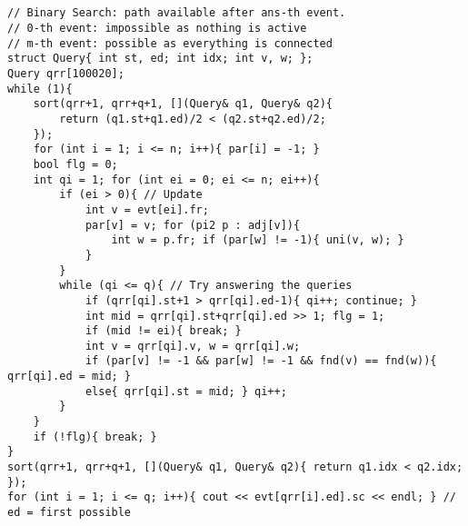 \documentclass[landscape, 8pt, a4paper, oneside, twocolumn]{extarticle}
\begin{document}
\subsection{}
\begin{verbatim}
// Binary Search: path available after ans-th event.
// 0-th event: impossible as nothing is active
// m-th event: possible as everything is connected
struct Query{ int st, ed; int idx; int v, w; };
Query qrr[100020];
while (1){
    sort(qrr+1, qrr+q+1, [](Query& q1, Query& q2){
        return (q1.st+q1.ed)/2 < (q2.st+q2.ed)/2;
    });
    for (int i = 1; i <= n; i++){ par[i] = -1; }
    bool flg = 0;
    int qi = 1; for (int ei = 0; ei <= n; ei++){
        if (ei > 0){ // Update
            int v = evt[ei].fr;
            par[v] = v; for (pi2 p : adj[v]){
                int w = p.fr; if (par[w] != -1){ uni(v, w); }
            }
        }
        while (qi <= q){ // Try answering the queries
            if (qrr[qi].st+1 > qrr[qi].ed-1){ qi++; continue; }
            int mid = qrr[qi].st+qrr[qi].ed >> 1; flg = 1;
            if (mid != ei){ break; }
            int v = qrr[qi].v, w = qrr[qi].w;
            if (par[v] != -1 && par[w] != -1 && fnd(v) == fnd(w)){ qrr[qi].ed = mid; }
            else{ qrr[qi].st = mid; } qi++;
        }
    }
    if (!flg){ break; }
}
sort(qrr+1, qrr+q+1, [](Query& q1, Query& q2){ return q1.idx < q2.idx; });
for (int i = 1; i <= q; i++){ cout << evt[qrr[i].ed].sc << endl; } // ed = first possible
\end{verbatim}
\end{document}

